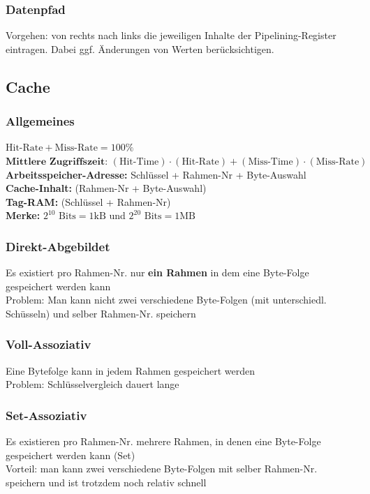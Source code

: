 \documentclass[german]{latex4ei/latex4ei_sheet}
\begin{document}
\subsubsection{Datenpfad}
Vorgehen: von rechts nach links die jeweiligen Inhalte der Pipelining-Register eintragen. Dabei ggf. Änderungen von Werten berücksichtigen.
\begin{minipage}{\columnwidth}
\subsection{Cache}
\subsubsection{Allgemeines}
$\text{Hit-Rate} + \text{Miss-Rate} = 100\%$ \\
$\textbf{Mittlere Zugriffszeit: } (\text{Hit-Time}) \cdot (\text{Hit-Rate}) + (\text{Miss-Time}) \cdot (\text{Miss-Rate})$ \\
\textbf{Arbeitsspeicher-Adresse:} Schlüssel + Rahmen-Nr + Byte-Auswahl \\
\textbf{Cache-Inhalt:} (Rahmen-Nr + Byte-Auswahl)\\
\textbf{Tag-RAM:} (Schlüssel + Rahmen-Nr)\\
\textbf{Merke:} $2^{10} \text{ Bits}= 1 \text{kB}$ und $2^{20} \text{ Bits}=1 \text{MB}$\\
\end{minipage}
\subsubsection{Direkt-Abgebildet}
Es existiert pro Rahmen-Nr. nur \textbf{ein Rahmen} in dem eine Byte-Folge gespeichert werden kann \\
Problem: Man kann nicht zwei verschiedene Byte-Folgen (mit unterschiedl. Schüsseln) und selber Rahmen-Nr. speichern
\subsubsection{Voll-Assoziativ}
Eine Bytefolge kann in jedem Rahmen gespeichert werden \\
Problem: Schlüsselvergleich dauert lange
\subsubsection{Set-Assoziativ}
Es existieren pro Rahmen-Nr. mehrere Rahmen, in denen eine Byte-Folge gespeichert werden kann (Set) \\
Vorteil: man kann zwei verschiedene Byte-Folgen mit selber Rahmen-Nr. speichern und ist trotzdem noch relativ schnell
\end{document}
